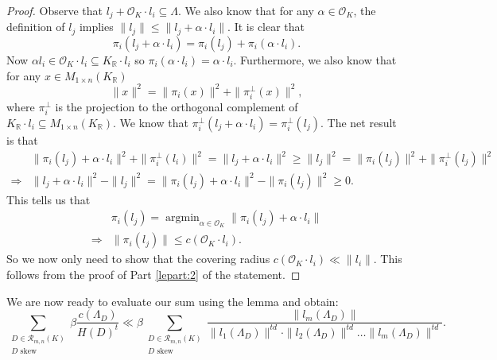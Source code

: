 \documentclass{amsart}
\newcommand{\OK}{\mathcal{O}_K}
\DeclareMathOperator{\argmin}{argmin}
\begin{document}
\begin{proof}
Observe that $l_j + \OK \cdot l_i \subseteq \Lambda$. We also know that for any $\alpha \in \OK$,
the definition of $l_j$ implies $\|l_j\| \leq \|l _j + \alpha \cdot l_i\|$.
It is clear that 
\begin{equation}
  \pi_{i}(l_j + \alpha  \cdot l_i) = \pi_{i}(l_j) +   \pi_{i}(\alpha \cdot l_{i}) .
\end{equation}
Now $\alpha l_{i} \in \OK \cdot l_{i} \subseteq K_\mathbb{R} \cdot l_{i}$ so $\pi_{i}(\alpha \cdot l_i) = \alpha \cdot l_{i}$. Furthermore, we also know that for any $x \in M_{1 \times n}(K_\mathbb{R})$
\begin{equation}
	\|x\|^{2} = \|\pi_{i}(x)\|^{2} + \|\pi_{i}^{\perp}(x)\|^{2},
\end{equation}
where $\pi_{i}^{\perp}$ is the projection to the orthogonal complement of $K_\mathbb{R}\cdot l_{i} \subseteq M_{1 \times n}(K_\mathbb{R})$. 
We know that $\pi_{i}^{\perp}(l_j + \alpha \cdot l_i) = \pi_{i}^{\perp}(l_j)$.
The net result is that 
\begin{align}
& \|\pi_{i}(l_j) + \alpha \cdot l_i \|^{2} +  \|\pi_{i}^{\perp}(l_i)\|^{2}    = \|l_j + \alpha \cdot l_i\|^{2} \geq  \|l_j\|^{2} = \|\pi_{i}(l_j)\|^{2} + \|\pi_{i}^{\perp}(l_j)\|^{2}\\
 \Rightarrow
& \|l_j + \alpha \cdot l_i\|^{2} - \|l_j\|^{2} = \|\pi_{i}(l_j) + \alpha \cdot l_i\|^{2} - \|\pi_{i}(l_{j})\|^{2} \geq 0.
\end{align}
This tells us that
\begin{align}
  & \pi_{i}(l_j) = \argmin_{\alpha \in \OK} \|\pi_{i}(l_j) + \alpha \cdot l_i\| \\
  \Rightarrow & \|\pi_{i}(l_j)\| \leq c( \OK \cdot l_i).
\end{align}
So we now only need to show that the covering radius $c(\OK \cdot l_i) \ll \|l_i\|$. This follows 
from the proof of Part \ref{lepart:2} of the statement.
\end{proof}

We are now ready to evaluate our sum using the lemma and obtain:
\begin{equation}
	\sum_{\substack{D \in \mathcal{R}_{m,n}(K) \\ D \text{ skew} }}
\beta	\frac{  c(\Lambda_D) }{ H(D)^{t} } \ll 
\beta \sum_{\substack{D \in \mathcal{R}_{m,n}(K)  \\  D \text{ skew} }}
	\frac{ \|l_{m}(\Lambda_D) \| }{ \|l_1(\Lambda_D)\|^{td} \cdot \|l_2(\Lambda_D)\|^{td}\dots \|l_m(\Lambda_D)\|^{td}}.
\end{equation}
\end{document}
